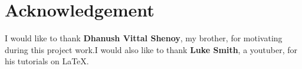\vfill
\vspace*{1cm}

\section{Acknowledgement}
I would like to thank \textbf{Dhanush Vittal Shenoy}, my brother, for motivating during this project work.I would also like to thank \textbf{Luke Smith}, a youtuber, for his tutorials on \LaTeX.
